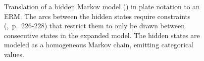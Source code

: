 \vspace*{1em}
\begin{figure}[h!]
\centering
\scalebox{\tikzScale}{\adjustTikzSize }
\caption[Hidden Markov model in plate notation to ERM translation]{Translation of a hidden Markov model (\cite{baum1970maximization}) in plate notation to an ERM. The arcs between the hidden states require constraints (\cite{heckerman2007probabilistic},~p.~226-228) that restrict them to only be drawn between consecutive states in the expanded model. The hidden states are modeled as a homogeneous Markov chain, emitting categorical values.}\label{fig:appendix_hmm}
\end{figure}

